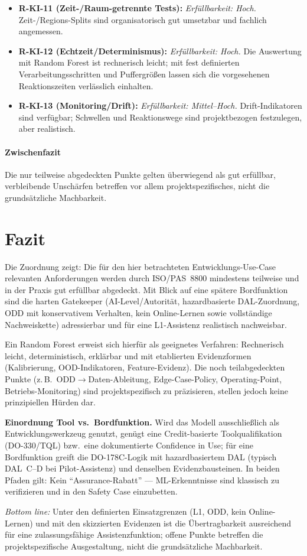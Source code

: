 \begin{itemize}
  \item \textbf{R-KI-11 (Zeit-/Raum-getrennte Tests):} \emph{Erfüllbarkeit: Hoch.}
        Zeit-/Regions-Splits sind organisatorisch gut umsetzbar und fachlich angemessen.

  \item \textbf{R-KI-12 (Echtzeit/Determinismus):} \emph{Erfüllbarkeit: Hoch.}
        Die Auswertung mit Random Forest ist rechnerisch leicht; mit fest definierten Verarbeitungsschritten 
        und Puffergrößen lassen sich die vorgesehenen Reaktionszeiten verlässlich einhalten.

  \item \textbf{R-KI-13 (Monitoring/Drift):} \emph{Erfüllbarkeit: Mittel–Hoch.}
        Drift-Indikatoren sind verfügbar; Schwellen und Reaktionswege sind projektbezogen festzulegen, aber realistisch.
\end{itemize}

\paragraph{Zwischenfazit}
Die nur teilweise abgedeckten Punkte gelten überwiegend als gut erfüllbar, verbleibende Unschärfen betreffen
vor allem projektspezifisches, nicht die grundsätzliche Machbarkeit.

\section{Fazit}
Die Zuordnung zeigt: Die für den hier betrachteten Entwicklungs-Use-Case relevanten Anforderungen werden durch
ISO/PAS~8800 mindestens teilweise und in der Praxis gut erfüllbar abgedeckt. Mit Blick auf eine
spätere Bordfunktion sind die harten Gatekeeper (AI-Level/Autorität, hazardbasierte DAL-Zuordnung, ODD mit
konservativem Verhalten, kein Online-Lernen sowie vollständige Nachweiskette) adressierbar und für eine
L1-Assistenz realistisch nachweisbar.

Ein Random Forest erweist sich hierfür als geeignetes Verfahren: Rechnerisch leicht, deterministisch,
erklärbar und mit etablierten Evidenzformen (Kalibrierung, OOD-Indikatoren, Feature-Evidenz). Die noch
teilabgedeckten Punkte (z.\,B.\ ODD\(\rightarrow\)Daten-Ableitung, Edge-Case-Policy, Operating-Point,
Betriebs-Monitoring) sind projektspezifisch zu präzisieren, stellen jedoch keine prinzipiellen Hürden dar.

\textbf{Einordnung Tool vs.\ Bordfunktion.} Wird das Modell ausschließlich als Entwicklungswerkzeug genutzt,
genügt eine Credit-basierte Toolqualifikation (DO-330/TQL) bzw.\ eine dokumentierte Confidence in Use;
für eine Bordfunktion greift die DO-178C-Logik mit hazardbasiertem DAL (typisch DAL~C–D bei Pilot-Assistenz)
und denselben Evidenzbausteinen. In beiden Pfaden gilt: Kein ``Assurance-Rabatt'' — ML-Erkenntnisse sind
klassisch zu verifizieren und in den Safety Case einzubetten.

\emph{Bottom line:} Unter den definierten Einsatzgrenzen (L1, ODD, kein Online-Lernen) und mit den skizzierten
Evidenzen ist die Übertragbarkeit ausreichend für eine zulassungsfähige Assistenzfunktion; offene Punkte
betreffen die projektspezifische Ausgestaltung, nicht die grundsätzliche Machbarkeit.
